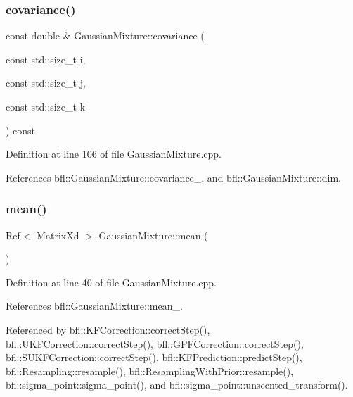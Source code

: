 \subsubsection{\texorpdfstring{covariance()}{covariance()}\hspace{0.1cm}{\footnotesize\ttfamily [6/6]}}
{\footnotesize\ttfamily const double \& Gaussian\+Mixture\+::covariance (\begin{DoxyParamCaption}\item[{const std\+::size\+\_\+t}]{i,  }\item[{const std\+::size\+\_\+t}]{j,  }\item[{const std\+::size\+\_\+t}]{k }\end{DoxyParamCaption}) const\hspace{0.3cm}{\ttfamily [inherited]}}



Definition at line 106 of file Gaussian\+Mixture.\+cpp.



References bfl\+::\+Gaussian\+Mixture\+::covariance\+\_\+, and bfl\+::\+Gaussian\+Mixture\+::dim.

\mbox{\label{classbfl_1_1GaussianMixture_af4fd865a97ac27c72510cfbf9429bd97}} 
\subsubsection{\texorpdfstring{mean()}{mean()}\hspace{0.1cm}{\footnotesize\ttfamily [1/6]}}
{\footnotesize\ttfamily Ref$<$ Matrix\+Xd $>$ Gaussian\+Mixture\+::mean (\begin{DoxyParamCaption}{ }\end{DoxyParamCaption})\hspace{0.3cm}{\ttfamily [inherited]}}



Definition at line 40 of file Gaussian\+Mixture.\+cpp.



References bfl\+::\+Gaussian\+Mixture\+::mean\+\_\+.



Referenced by bfl\+::\+K\+F\+Correction\+::correct\+Step(), bfl\+::\+U\+K\+F\+Correction\+::correct\+Step(), bfl\+::\+G\+P\+F\+Correction\+::correct\+Step(), bfl\+::\+S\+U\+K\+F\+Correction\+::correct\+Step(), bfl\+::\+K\+F\+Prediction\+::predict\+Step(), bfl\+::\+Resampling\+::resample(), bfl\+::\+Resampling\+With\+Prior\+::resample(), bfl\+::sigma\+\_\+point\+::sigma\+\_\+point(), and bfl\+::sigma\+\_\+point\+::unscented\+\_\+transform().

